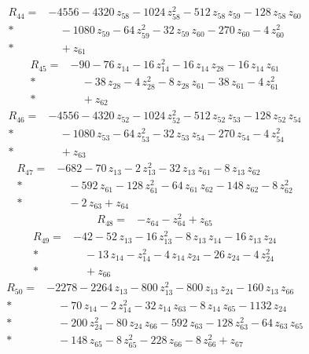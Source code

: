 \documentclass[10pt]{article}
\begin{document}
\begin{align*}
R_{44}={}& - 4556 - 4320\,z_{58} - 1024\,z_{58}^{2} - 512\,z_{58}\,z_{59} - 128\,z_{58}\,z_{60} \\*
&\quad - 1080\,z_{59} - 64\,z_{59}^{2} - 32\,z_{59}\,z_{60} - 270\,z_{60} - 4\,z_{60}^{2} \\*
&\quad + z_{61}
\end{align*}
\begin{align*}
R_{45}={}& - 90 - 76\,z_{14} - 16\,z_{14}^{2} - 16\,z_{14}\,z_{28} - 16\,z_{14}\,z_{61} \\*
&\quad - 38\,z_{28} - 4\,z_{28}^{2} - 8\,z_{28}\,z_{61} - 38\,z_{61} - 4\,z_{61}^{2} \\*
&\quad + z_{62}
\end{align*}
\begin{align*}
R_{46}={}& - 4556 - 4320\,z_{52} - 1024\,z_{52}^{2} - 512\,z_{52}\,z_{53} - 128\,z_{52}\,z_{54} \\*
&\quad - 1080\,z_{53} - 64\,z_{53}^{2} - 32\,z_{53}\,z_{54} - 270\,z_{54} - 4\,z_{54}^{2} \\*
&\quad + z_{63}
\end{align*}
\begin{align*}
R_{47}={}& - 682 - 70\,z_{13} - 2\,z_{13}^{2} - 32\,z_{13}\,z_{61} - 8\,z_{13}\,z_{62} \\*
&\quad - 592\,z_{61} - 128\,z_{61}^{2} - 64\,z_{61}\,z_{62} - 148\,z_{62} - 8\,z_{62}^{2} \\*
&\quad - 2\,z_{63} + z_{64}
\end{align*}
\begin{align*}
R_{48}={}& - z_{64} - z_{64}^{2} + z_{65}
\end{align*}
\begin{align*}
R_{49}={}& - 42 - 52\,z_{13} - 16\,z_{13}^{2} - 8\,z_{13}\,z_{14} - 16\,z_{13}\,z_{24} \\*
&\quad - 13\,z_{14} - z_{14}^{2} - 4\,z_{14}\,z_{24} - 26\,z_{24} - 4\,z_{24}^{2} \\*
&\quad + z_{66}
\end{align*}
\begin{align*}
R_{50}={}& - 2278 - 2264\,z_{13} - 800\,z_{13}^{2} - 800\,z_{13}\,z_{24} - 160\,z_{13}\,z_{66} \\*
&\quad - 70\,z_{14} - 2\,z_{14}^{2} - 32\,z_{14}\,z_{63} - 8\,z_{14}\,z_{65} - 1132\,z_{24} \\*
&\quad - 200\,z_{24}^{2} - 80\,z_{24}\,z_{66} - 592\,z_{63} - 128\,z_{63}^{2} - 64\,z_{63}\,z_{65} \\*
&\quad - 148\,z_{65} - 8\,z_{65}^{2} - 228\,z_{66} - 8\,z_{66}^{2} + z_{67}
\end{align*}
\end{document}
